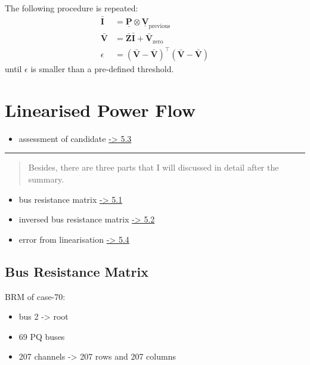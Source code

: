 \documentclass[
]{book}
\providecommand{\tightlist}{%
  \setlength{\itemsep}{0pt}\setlength{\parskip}{0pt}}
\begin{document}
The following procedure is repeated:
\[ \begin{aligned}
    \boldsymbol{\bar{I}} &= \boldsymbol{\underline{P}}
      \otimes \boldsymbol{\underline{V}}_\text{previous} \\
    \boldsymbol{\bar{V}}
    &= \boldsymbol{\bar{Z}} \boldsymbol{\bar{I}}
      + \boldsymbol{\bar{V}}_\text{zero} \\
    \epsilon
    &= \left( \boldsymbol{\bar{V}} - \boldsymbol{\bar{V}} \right)^\top
      \left( \boldsymbol{\bar{V}} - \boldsymbol{\bar{V}} \right)
\end{aligned} \]
until \(\epsilon\) is smaller than a pre-defined threshold.

\hypertarget{linearised-power-flow}{%
\chapter{Linearised Power Flow}\label{linearised-power-flow}}

\begin{itemize}
\tightlist
\item
  assessment of candidate \protect\hyperlink{assessment}{-\textgreater{} 5.3}
\end{itemize}

\begin{center}\rule{0.5\linewidth}{0.5pt}\end{center}

\begin{quote}
Besides, there are three parts that I will discussed in detail after the
summary.
\end{quote}

\begin{itemize}
\tightlist
\item
  bus resistance matrix \protect\hyperlink{BRM}{-\textgreater{} 5.1}
\item
  inversed bus resistance matrix \protect\hyperlink{brmInv}{-\textgreater{} 5.2}
\item
  error from linearisation \protect\hyperlink{error}{-\textgreater{} 5.4}
\end{itemize}

\hypertarget{BRM}{%
\section{Bus Resistance Matrix}\label{BRM}}

BRM of case-70:

\begin{itemize}
\tightlist
\item
  bus 2 -\textgreater{} root
\item
  69 PQ buses
\item
  207 channels -\textgreater{} 207 rows and 207 columns
\end{itemize}
\end{document}
